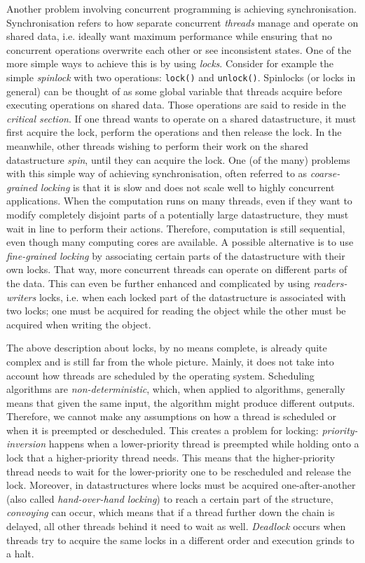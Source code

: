 Another problem involving concurrent programming is achieving synchronisation. Synchronisation refers to how separate concurrent \textit{threads} manage and operate on shared data, i.e. ideally want maximum performance while ensuring that no concurrent operations overwrite each other or see inconsistent states. One of the more simple ways to achieve this is by using \textit{locks}. Consider for example the simple \textit{spinlock} with two operations: \texttt{lock()} and \texttt{unlock()}. Spinlocks (or locks in general) can be thought of as some global variable that threads acquire before executing operations on shared data. Those operations are said to reside in the \textit{critical section}. If one thread wants to operate on a shared datastructure, it must first acquire the lock, perform the operations and then release the lock. In the meanwhile, other threads wishing to perform their work on the shared datastructure \textit{spin}, until they can acquire the lock. One (of the many) problems with this simple way of achieving synchronisation, often referred to as \textit{coarse-grained locking} is that it is slow and does not scale well to highly concurrent applications. When the computation runs on many threads, even if they want to modify completely disjoint parts of a potentially large datastructure, they must wait in line to perform their actions. Therefore, computation is still sequential, even though many computing cores are available. A possible alternative is to use \textit{fine-grained locking} by associating certain parts of the datastructure with their own locks. That way, more concurrent threads can operate on different parts of the data. This can even be further enhanced and complicated by using \textit{readers-writers} locks, i.e. when each locked part of the datastructure is associated with two locks; one must be acquired for reading the object while the other must be acquired when writing the object. 

The above description about locks, by no means complete, is already quite complex and is still far from the whole picture. Mainly, it does not take into account how threads are scheduled by the operating system. Scheduling algorithms are \textit{non-deterministic}, which, when applied to algorithms, generally means that given the same input, the algorithm might produce different outputs. Therefore, we cannot make any assumptions on how a thread is scheduled or when it is preempted or descheduled. This creates a problem for locking: \textit{priority-inversion} happens when a lower-priority thread is preempted while holding onto a lock that a higher-priority thread needs. This means that the higher-priority thread needs to wait for the lower-priority one to be rescheduled and release the lock. Moreover, in datastructures where locks must be acquired one-after-another (also called \textit{hand-over-hand locking}) to reach a certain part of the structure, \textit{convoying} can occur, which means that if a thread further down the chain is delayed, all other threads behind it need to wait as well. \textit{Deadlock} occurs when threads try to acquire the same locks in a different order and execution grinds to a halt.

